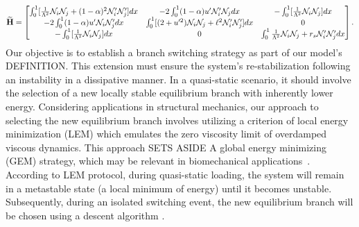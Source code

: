 \begin{equation}
    \widetilde{\mathbf{H}}=
    \begin{bmatrix}
    \int_0^1[ \frac{1}{\Lambda^2}{\mathcal N}_i{\mathcal N}_j + (1-\alpha)^2{\mathcal N}'_i{\mathcal N}'_j] dx&
-2\int_0^1(1-\alpha)u' {\mathcal N}'_i {\mathcal N}_j  dx&
-\int_0^1[\frac{1}{\Lambda^2}{\mathcal N}_i {\mathcal N}_j]  dx\\

-2\int_0^1(1-\alpha)u' {\mathcal N}_i {\mathcal N}'_j dx&
 \int_0^1 [ (2+u'^2){\mathcal N}_i{\mathcal N}_j +\ell^2{\mathcal N}'_i{\mathcal N}'_j] dx&
 0\\

-\int_0^1[\frac{1}{\Lambda^2}{\mathcal N}_i{\mathcal N}_j ] dx
&0
&\int_0^1\frac{1}{\Lambda^2}{\mathcal N}_i {\mathcal N}_j+r_s{\mathcal N}'_i {\mathcal N}'_j  dx
\end{bmatrix}.
\label{eq:stifness2}
\end{equation}
Our objective is to establish a branch switching strategy as part of our model's DEFINITION. This extension must ensure the system's re-stabilization following an instability in a dissipative manner. In a quasi-static scenario, it should involve the selection of a new locally stable equilibrium branch with inherently lower energy.  Considering applications in structural mechanics, our approach to selecting the new equilibrium branch involves utilizing a criterion of local energy minimization (LEM)  which emulates the zero viscosity limit of overdamped viscous dynamics. This approach SETS ASIDE A global energy minimizing (GEM) strategy, which may be relevant in biomechanical applications~\cite{Salman2021-mn}. According to LEM protocol, during quasi-static loading, the system will remain in a metastable state (a local minimum of energy) until it becomes unstable. Subsequently, during an isolated switching event, the new equilibrium branch will be chosen using a descent algorithm \cite{Puglisi2005-lg}.
